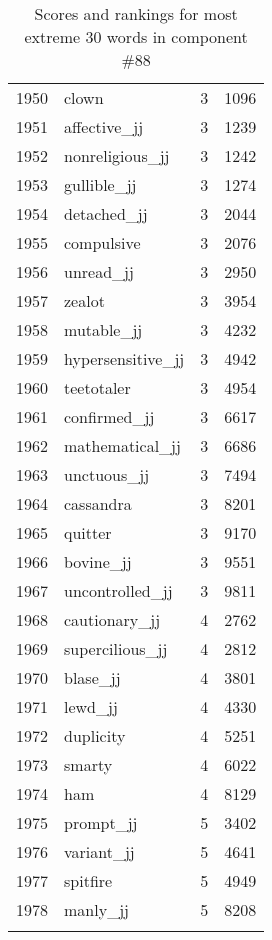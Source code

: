\begin{longtable}[!htbp]{| rlr@{.}l |}
    1950 & clown & 3 & 1096 \\
    1951 & affective\_jj & 3 & 1239 \\
    1952 & nonreligious\_jj & 3 & 1242 \\
    1953 & gullible\_jj & 3 & 1274 \\
    1954 & detached\_jj & 3 & 2044 \\
    1955 & compulsive & 3 & 2076 \\
    1956 & unread\_jj & 3 & 2950 \\
    1957 & zealot & 3 & 3954 \\
    1958 & mutable\_jj & 3 & 4232 \\
    1959 & hypersensitive\_jj & 3 & 4942 \\
    1960 & teetotaler & 3 & 4954 \\
    1961 & confirmed\_jj & 3 & 6617 \\
    1962 & mathematical\_jj & 3 & 6686 \\
    1963 & unctuous\_jj & 3 & 7494 \\
    1964 & cassandra & 3 & 8201 \\
    1965 & quitter & 3 & 9170 \\
    1966 & bovine\_jj & 3 & 9551 \\
    1967 & uncontrolled\_jj & 3 & 9811 \\
    1968 & cautionary\_jj & 4 & 2762 \\
    1969 & supercilious\_jj & 4 & 2812 \\
    1970 & blase\_jj & 4 & 3801 \\
    1971 & lewd\_jj & 4 & 4330 \\
    1972 & duplicity & 4 & 5251 \\
    1973 & smarty & 4 & 6022 \\
    1974 & ham & 4 & 8129 \\
    1975 & prompt\_jj & 5 & 3402 \\
    1976 & variant\_jj & 5 & 4641 \\
    1977 & spitfire & 5 & 4949 \\
    1978 & manly\_jj & 5 & 8208 \\
    \hline
    \caption{Scores and rankings for most extreme 30 words in component \#88} \\
\end{longtable}
